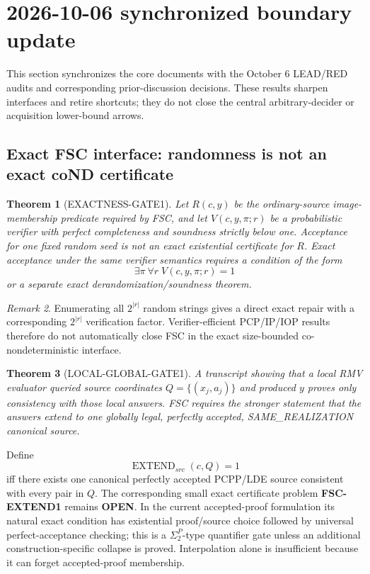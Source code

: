 \documentclass[11pt]{article}
\newcommand{\statusopen}{\textcolor{openstatus}{\textbf{OPEN}}}
\theoremstyle{plain}
\newtheorem{theorem}{Theorem}[section]
\theoremstyle{definition}
\theoremstyle{remark}
\newtheorem{remark}[theorem]{Remark}
\begin{document}
\section{2026-10-06 synchronized boundary update}

This section synchronizes the core documents with the October 6 LEAD/RED
audits and corresponding prior-discussion decisions. These results sharpen
interfaces and retire shortcuts; they do not close the central
arbitrary-decider or acquisition lower-bound arrows.

\subsection{Exact FSC interface: randomness is not an exact coND certificate}

\begin{theorem}[EXACTNESS-GATE1]
Let \(R(c,y)\) be the ordinary-source image-membership predicate required by
FSC, and let \(V(c,y,\pi;r)\) be a probabilistic verifier with perfect
completeness and soundness strictly below one. Acceptance for one fixed random
seed is not an exact existential certificate for \(R\). Exact acceptance
under the same verifier semantics requires a condition of the form
\[
\exists \pi\ \forall r\; V(c,y,\pi;r)=1
\]
or a separate exact derandomization/soundness theorem.
\end{theorem}

\begin{remark}
Enumerating all \(2^{|r|}\) random strings gives a direct exact repair with a
corresponding \(2^{|r|}\) verification factor. Verifier-efficient PCP/IP/IOP
results therefore do not automatically close FSC in the exact size-bounded
co-nondeterministic interface.
\end{remark}

\begin{theorem}[LOCAL-GLOBAL-GATE1]
A transcript showing that a local RMV evaluator queried source coordinates
\(Q=\{(x_j,a_j)\}\) and produced \(y\) proves only consistency with those
local answers. FSC requires the stronger statement that the answers extend to
one globally legal, perfectly accepted, SAME\_REALIZATION canonical source.
\end{theorem}

Define
\[
\operatorname{EXTEND}_{src}(c,Q)=1
\]
iff there exists one canonical perfectly accepted PCPP/LDE source consistent
with every pair in \(Q\). The corresponding small exact certificate problem
\textbf{FSC-EXTEND1} remains \statusopen. In the current accepted-proof
formulation its natural exact condition has existential proof/source choice
followed by universal perfect-acceptance checking; this is a
\(\Sigma_2^P\)-type quantifier gate unless an additional
construction-specific collapse is proved. Interpolation alone is insufficient
because it can forget accepted-proof membership.
\end{document}
